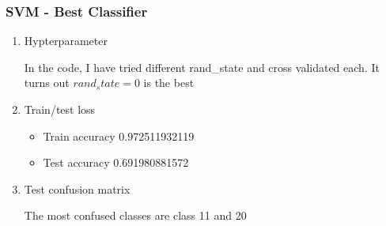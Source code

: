 \documentclass[letterpaper, 12]{article}
\begin{document}
\subsubsection{SVM - Best Classifier}
\begin{enumerate}

    \item Hypterparameter
	
	In the code, I have tried different rand\_state and cross validated each. It turns out $rand_state = 0$ is the best
	
	\item Train/test loss
	\begin{itemize}
     \item  Train accuracy  0.972511932119
     \item Test accuracy 0.691980881572
        \end{itemize}
        \item Test confusion matrix
        
        The most confused classes are class 11 and 20


\end{enumerate}
\end{document}
